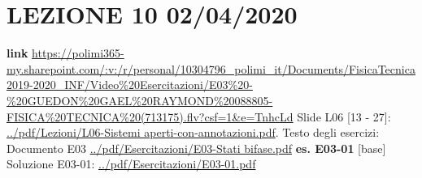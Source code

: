 \section*{LEZIONE 10 02/04/2020}
\textbf{link} \url{https://polimi365-my.sharepoint.com/:v:/r/personal/10304796_polimi_it/Documents/FisicaTecnica2019-2020_INF/Video%20Esercitazioni/E03%20-%20GUEDON%20GAEL%20RAYMOND%20088805-FISICA%20TECNICA%20(713175).flv?csf=1&e=TnhcLd}\newline
\newline
Slide L06 [13 - 27]: \url{../pdf/Lezioni/L06-Sistemi aperti-con-annotazioni.pdf}.\newline
\newline
Testo degli esercizi:\newline
Documento E03 \url{../pdf/Esercitazioni/E03-Stati bifase.pdf}\newline
\textbf{es. E03-01} [base]\newline
Soluzione E03-01: \url{../pdf/Esercitazioni/E03-01.pdf}
